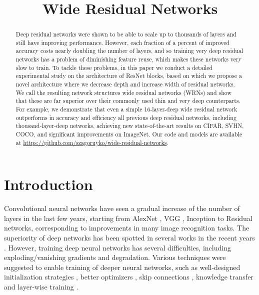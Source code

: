 \documentclass{bmvc2k}
\title{\titlespace Wide Residual Networks}
\begin{document}
\maketitle

\begin{abstract}
  Deep residual networks were shown to be able to scale up to thousands of layers and still have improving performance. However, each fraction of a percent of improved accuracy costs nearly doubling the number of layers, and so training very deep residual networks has a problem of diminishing feature reuse, which makes these networks very slow to train. To tackle these problems, in this paper we conduct a detailed experimental study on the architecture of ResNet blocks, based on which we propose a novel architecture where we decrease depth and increase width of residual networks. We call the resulting network structures wide residual networks (WRNs) and show that these are far superior over their commonly used thin and very deep counterparts. For example, we demonstrate that even a simple 16-layer-deep wide residual network outperforms in accuracy and efficiency all previous deep residual networks, including thousand-layer-deep networks, achieving new state-of-the-art results on CIFAR, SVHN, COCO, and significant improvements on ImageNet. Our code and models are available at \url{https://github.com/szagoruyko/wide-residual-networks}.
\end{abstract}

\section{Introduction}
\label{sec:intro}

Convolutional neural networks have seen a gradual increase of the number of layers in the last few years, starting from AlexNet \cite{AlexNet}, VGG \cite{Simonyan15}, Inception \cite{GoogLeNet} to Residual \cite{he2015deep} networks, corresponding to improvements in many image recognition tasks. The superiority of deep networks has been spotted in several works in the recent years \cite{Bianchini,MontufarPCB14}. However, training deep neural networks has several difficulties, including exploding/vanishing gradients and degradation. Various techniques were suggested to enable training of deeper neural networks, such as well-designed initialization strategies \cite{GlorotAISTATS2010,journals/corr/HeZR015}, better optimizers \cite{SutskeverMartensDahlHinton_icml2013}, skip connections \cite{dsn,AISTATS2012_RaikoVL12}, knowledge transfer \cite{Romero-et-al-TR2014,Chen:ICLR16} and layer-wise training \cite{Schmidhuber:92ncchunker}.
\end{document}
